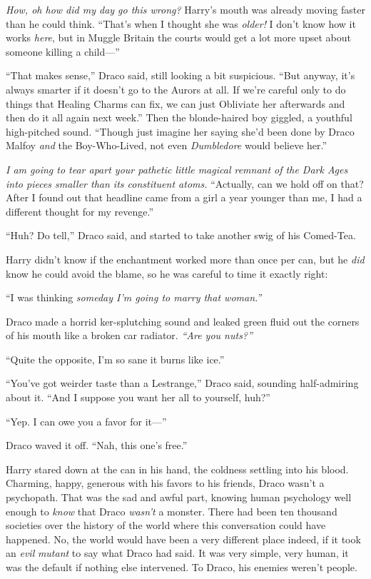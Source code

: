 \emph{How, oh how did my day go this wrong?} Harry's mouth was already
moving faster than he could think. ``That's when I thought she was
\emph{older!} I don't know how it works \emph{here}, but in Muggle
Britain the courts would get a lot more upset about someone killing a
child---''

``That makes sense,'' Draco said, still looking a bit suspicious. ``But
anyway, it's always smarter if it doesn't go to the Aurors at all. If
we're careful only to do things that Healing Charms can fix, we can just
Obliviate her afterwards and then do it all again next week.'' Then the
blonde-haired boy giggled, a youthful high-pitched sound. ``Though just
imagine her saying she'd been done by Draco Malfoy \emph{and} the
Boy-Who-Lived, not even \emph{Dumbledore} would believe her.''

\emph{I am going to tear apart your pathetic little magical remnant of
the Dark Ages into pieces smaller than its constituent atoms.
}``Actually, can we hold off on that? After I found out that headline
came from a girl a year younger than me, I had a different thought for
my revenge.''

``Huh? Do tell,'' Draco said, and started to take another swig of his
Comed-Tea.

Harry didn't know if the enchantment worked more than once per can, but
he \emph{did} know he could avoid the blame, so he was careful to time
it exactly right:

``I was thinking \emph{someday I'm going to marry that woman.''}

Draco made a horrid ker-splutching sound and leaked green fluid out the
corners of his mouth like a broken car radiator. \emph{``Are you
nuts?''}

``Quite the opposite, I'm so sane it burns like ice.''

``You've got weirder taste than a Lestrange,'' Draco said, sounding
half-admiring about it. ``And I suppose you want her all to yourself,
huh?''

``Yep. I can owe you a favor for it---''

Draco waved it off. ``Nah, this one's free.''

Harry stared down at the can in his hand, the coldness settling into his
blood. Charming, happy, generous with his favors to his friends, Draco
wasn't a psychopath. That was the sad and awful part, knowing human
psychology well enough to \emph{know} that Draco \emph{wasn't} a
monster. There had been ten thousand societies over the history of the
world where this conversation could have happened. No, the world would
have been a very different place indeed, if it took an \emph{evil}
\emph{mutant} to say what Draco had said. It was very simple, very
human, it was the default if nothing else intervened. To Draco, his
enemies weren't people.

